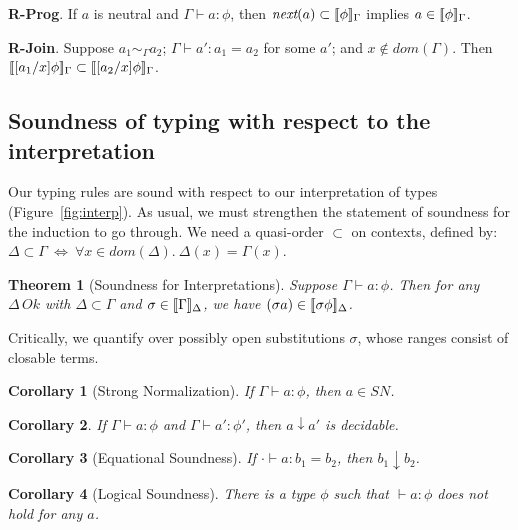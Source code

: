 \documentclass[copyright]{eptcs}
\newtheorem{theorem}{Theorem}
\newtheorem{corollary}{Corollary}
\newcommand{\next}[0]{\textit{next}}
\newcommand{\SN}[0]{\textit{SN}}
\newcommand{\interp}[1]{[\negthinspace[#1]\negthinspace]}
\begin{document}
\noindent \textbf{R-Prog}. If $a$ is neutral and $\Gamma\vdash
a:\phi$, then
$\next(a)\subset\interp{\phi}_\Gamma$ implies $a\in\interp{\phi}_\Gamma$.

\noindent \textbf{R-Join}. Suppose $a_1 \sim_\Gamma a_2$;
$\Gamma\vdash a':a_1 = a_2$ for some $a'$; and
$x\not\in\textit{dom}(\Gamma)$. Then $\interp{[a_1/x]\phi}_\Gamma\subset
\interp{[a_2/x]\phi}_\Gamma$.


\subsection{Soundness of typing with respect to the interpretation}

Our typing rules are sound with respect to our interpretation of types
(Figure~\ref{fig:interp}).  As usual, we must strengthen the statement
of soundness for the induction to go through.  We need a quasi-order
$\subset$ on contexts, defined by:
$\Delta\subset\Gamma\ \Leftrightarrow\ \forall
x\in\textit{dom}(\Delta).\ \Delta(x) = \Gamma(x)$.

\begin{theorem}[Soundness for Interpretations]
\label{thm:soundness}
Suppose $\Gamma\vdash a:\phi$.  Then for any $\Delta\,\textit{Ok}$
with $\Delta\subset\Gamma$ and $\sigma\in\interp{\Gamma}_{\Delta}$, we
have $(\sigma a)\in\interp{\sigma \phi}_{\Delta}$.  
\end{theorem}

\noindent Critically, we quantify over possibly open substitutions
$\sigma$, whose ranges consist of closable terms.  

\begin{corollary}[Strong Normalization]
\label{cor:sn}
If $\Gamma \vdash a : \phi$, then $a\in\SN$.
\end{corollary}

\begin{corollary}
\label{cor:eqdec}
If $\Gamma \vdash a : \phi$ and $\Gamma \vdash a' : \phi'$, then $a \downarrow a'$ is decidable.
\end{corollary}

\begin{corollary}[Equational Soundness]
\label{cor:eqsnd}
If $\cdot \vdash a:b_1 = b_2$, then $b_1 \downarrow b_2$.
\end{corollary}

\begin{corollary}[Logical Soundness]
There is a type $\phi$ such that $\vdash a:\phi$ does not hold for any $a$.
\end{corollary}
\end{document}
